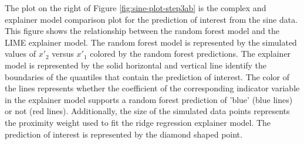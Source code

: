 \documentclass[AMS,STIX2COL]{WileyNJD-v2}\usepackage[]{graphicx}\usepackage[]{color}
\newcommand{\hh}[1]{\textcolor{orange}{#1}}
\newcommand{\data}{sine data}
\begin{document}
{%

The plot on the right of Figure \ref{fig:sine-plot-step3ab} is the complex and explainer model comparison plot for the prediction of interest from the \data. This figure shows the relationship between the random forest model and the LIME explainer model. The random forest model is represented by the simulated values of $x'_2$ versus $x'_1$ colored by the random forest predictions. The explainer model is represented by the solid horizontal and vertical line identify the boundaries of the quantiles that contain the prediction of interest. The color of the lines represents whether the coefficient of the corresponding indicator variable in the explainer model supports a random forest prediction of 'blue' (blue lines) or not (red lines). Additionally, the size of the simulated data points represents the proximity weight used to fit the ridge regression explainer model. The prediction of interest is represented by the diamond shaped point.


}
\end{document}
